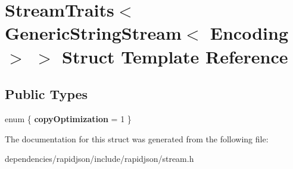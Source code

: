 \hypertarget{struct_stream_traits_3_01_generic_string_stream_3_01_encoding_01_4_01_4}{}\section{Stream\+Traits$<$ Generic\+String\+Stream$<$ Encoding $>$ $>$ Struct Template Reference}
\label{struct_stream_traits_3_01_generic_string_stream_3_01_encoding_01_4_01_4}
\subsection*{Public Types}
\begin{DoxyCompactItemize}
\item 
\mbox{\label{struct_stream_traits_3_01_generic_string_stream_3_01_encoding_01_4_01_4_a23baa9380940615a3b3a697ca02b2ab0}} 
enum \{ {\bfseries copy\+Optimization} = 1
 \}
\end{DoxyCompactItemize}


The documentation for this struct was generated from the following file\+:\begin{DoxyCompactItemize}
\item 
dependencies/rapidjson/include/rapidjson/stream.\+h\end{DoxyCompactItemize}
